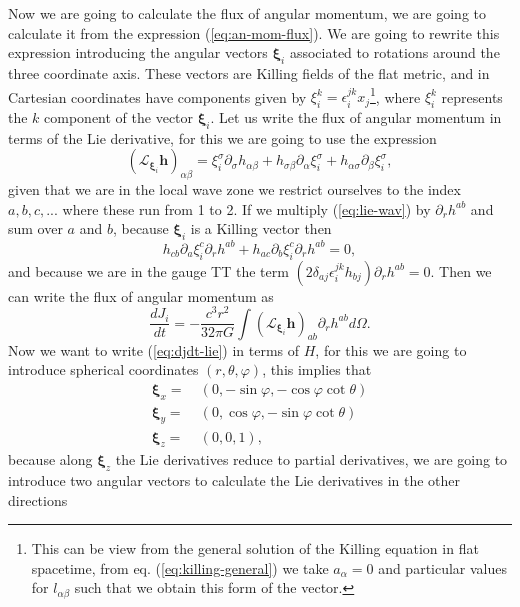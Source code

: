 Now we are going to calculate the flux of angular momentum, we are
going to calculate it from the expression (\ref{eq:an-mom-flux}). We are going
to rewrite this expression introducing the angular vectors $\boldsymbol{\xi}_{i}$
associated to rotations around the three coordinate axis. These vectors
are Killing fields of the flat metric, and in Cartesian coordinates
have components given by $\xi_{i}^{k}=\epsilon_{i}^{jk}x_{j}$\footnote{This can be view from the general solution of the Killing equation
in flat spacetime, from eq. (\ref{eq:killing-general}) we take $a_{\alpha}=0$ and
particular values for $l_{\alpha\beta}$ such that we obtain this
form of the vector.}, where $\xi_{i}^{k}$ represents the $k$ component of the vector
$\boldsymbol{\xi}_{i}$. Let us write the flux of angular momentum
in terms of the Lie derivative, for this we are going to use the expression
\begin{equation}
\left(\mathcal{L}_{\boldsymbol{\xi}_{i}}\boldsymbol{h}\right)_{\alpha\beta}=\xi_{i}^{\sigma}\partial_{\sigma}h_{\alpha\beta}+h_{\sigma\beta}\partial_{\alpha}\xi_{i}^{\sigma}+h_{\alpha\sigma}\partial_{\beta}\xi_{i}^{\sigma},\label{eq:lie-wav}
\end{equation}
given that we are in the local wave zone we restrict ourselves to
the index $a,b,c,...$ where these run from 1 to 2. If we multiply
(\ref{eq:lie-wav}) by $\partial_{r}h^{ab}$ and sum over $a$ and
$b$, because $\boldsymbol{\xi}_{i}$ is a Killing vector then
\[
h_{cb}\partial_{a}\xi_{i}^{c}\partial_{r}h^{ab}+h_{ac}\partial_{b}\xi_{i}^{c}\partial_{r}h^{ab}=0,
\]
and because we are in the gauge TT the term $\left(2\delta_{aj}\epsilon_{i}^{jk}h_{bj}\right)\partial_{r}h^{ab}=0.$
Then we can write the flux of angular momentum as
\begin{equation}
\frac{dJ_{i}}{dt}=-\frac{c^{3}r^{2}}{32\pi G}\int\left(\mathcal{L}_{\boldsymbol{\xi}_{i}}\boldsymbol{h}\right)_{ab}\partial_{r}h^{ab}d\Omega.\label{eq:djdt-lie}
\end{equation}
Now we want to write (\ref{eq:djdt-lie}) in terms of $H$, for this
we are going to introduce spherical coordinates $(r,\theta,\varphi)$,
this implies that
\begin{align*}
\boldsymbol{\xi}_{x}= & \ \left(0,-\sin\varphi,-\cos\varphi\cot\theta\right)\\
\boldsymbol{\xi}_{y}= & \ \left(0,\cos\varphi,-\sin\varphi\cot\theta\right)\\
\boldsymbol{\xi}_{z}= & \ \left(0,0,1\right),
\end{align*}
because along $\boldsymbol{\xi}_{z}$ the Lie derivatives reduce to
partial derivatives, we are going to introduce two angular vectors
to calculate the Lie derivatives in the other directions

